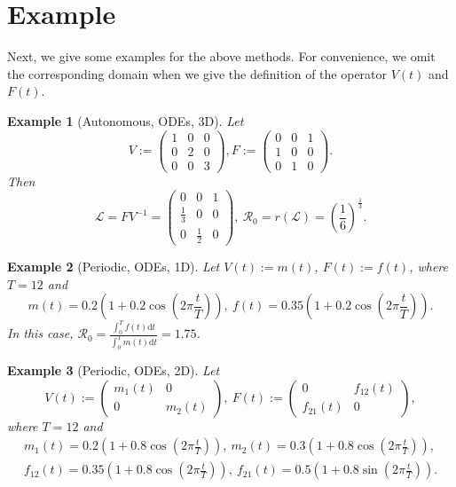 \documentclass[12pt,reqno]{article}
\newtheorem{example}{Example}
\newcommand{\D}{\mathrm{d}}
\newcommand{\cL}{\mathcal{L}}
\newcommand{\R}{\mathcal{R}_0}
\begin{document}
\section{Example}\label{sec:example}
Next, we give some examples for the above methods. For convenience, we omit the corresponding domain when we give the definition of the operator $V(t)$ and $F(t)$.
\begin{example}[Autonomous, ODEs, 3D]
	Let
	$$
	V:=
	\left(
	\begin{matrix}
	1& 0& 0\\
	0& 2& 0\\
	0& 0& 3
	\end{matrix}
	\right),
	F:=
	\left(
	\begin{matrix}
	0& 0& 1\\
	1& 0& 0\\
	0& 1& 0
	\end{matrix}
	\right).
	$$
	 Then
	 $$
	 \cL=FV^{-1}=
	 \left(
	 \begin{matrix}
	 0& 0& 1\\
	 \frac{1}{3}& 0& 0\\
	 0& \frac{1}{2}& 0
	 \end{matrix}
	 \right),~
	 \R=r(\cL)= (\frac{1}{6})^{\frac{1}{3}}.
	 $$
\end{example}

\begin{example}[Periodic, ODEs, 1D] Let $V(t):=m(t)$, $F(t):=f(t)$, where $T=12$ and
	$$m(t)=0.2(1+0.2\cos(2\pi \frac{t}{T})), ~f(t)=0.35(1+0.2\cos(2\pi \frac{t}{T})).$$
	In this case, $\R = \frac{\int_{0}^{T} f(t) \D t}{\int_{0}^{T} m(t) \D t}=1.75$.
\end{example}

\begin{example}[Periodic, ODEs, 2D] Let
	$$V(t):=
	\left(
	\begin{matrix}
	m_1 (t) & 0\\
	0& m_2(t)
	\end{matrix}
	\right), ~
	F(t):=
	\left(
	\begin{matrix}
	0 & f_{12} (t)\\
	f_{21} (t)& 0
	\end{matrix}
	\right),
	$$ where $T=12$ and
	$$
\begin{aligned}
m_1(t)= 0.2(1+0.8\cos(2\pi \frac{t}{T})),~
m_2(t)= 0.3(1+0.8\cos(2\pi \frac{t}{T})),\\
f_{12}(t)=0.35(1+0.8\cos(2\pi \frac{t}{T})),~
f_{21}(t)=0.5(1+0.8\sin(2\pi \frac{t}{T})).
\end{aligned}
$$
\end{example}
\end{document}
